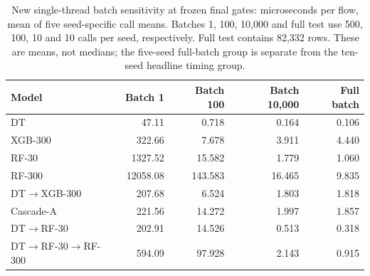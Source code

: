 \begin{table}[!htbp]
\centering
\caption{New single-thread batch sensitivity at frozen final gates: microseconds per flow, mean of five seed-specific call means. Batches 1, 100, 10,000 and full test use 500, 100, 10 and 10 calls per seed, respectively. Full test contains 82,332 rows. These are means, not medians; the five-seed full-batch group is separate from the ten-seed headline timing group.}
\label{tab:batch}
\small
\setlength{\tabcolsep}{4pt}
\begin{tabularx}{\textwidth}{@{}Xrrrr@{}}
\toprule
Model & Batch 1 & Batch 100 & Batch 10,000 & Full batch \\
\midrule
DT & 47.11 & 0.718 & 0.164 & 0.106 \\
XGB-300 & 322.66 & 7.678 & 3.911 & 4.440 \\
RF-30 & 1327.52 & 15.582 & 1.779 & 1.060 \\
RF-300 & 12058.08 & 143.583 & 16.465 & 9.835 \\
DT$\to$XGB-300 & 207.68 & 6.524 & 1.803 & 1.818 \\
Cascade-A & 221.56 & 14.272 & 1.997 & 1.857 \\
DT$\to$RF-30 & 202.91 & 14.526 & 0.513 & 0.318 \\
DT$\to$RF-30$\to$RF-300 & 594.09 & 97.928 & 2.143 & 0.915 \\
\bottomrule
\end{tabularx}
\end{table}

